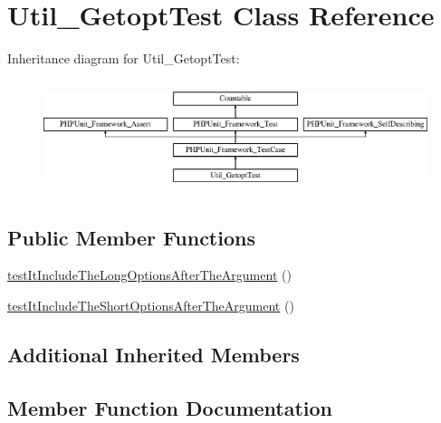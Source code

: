\hypertarget{class_util___getopt_test}{}\section{Util\+\_\+\+Getopt\+Test Class Reference}
\label{class_util___getopt_test}
Inheritance diagram for Util\+\_\+\+Getopt\+Test\+:\begin{figure}[H]
\begin{center}
\leavevmode
\includegraphics[height=3.303835cm]{class_util___getopt_test}
\end{center}
\end{figure}
\subsection*{Public Member Functions}
\begin{DoxyCompactItemize}
\item 
\mbox{\hyperlink{class_util___getopt_test_a905735c5b750529866bba801e8125eee}{test\+It\+Include\+The\+Long\+Options\+After\+The\+Argument}} ()
\item 
\mbox{\hyperlink{class_util___getopt_test_a4a9b5c6ef079722a8d6e6d9f22719749}{test\+It\+Include\+The\+Short\+Options\+After\+The\+Argument}} ()
\end{DoxyCompactItemize}
\subsection*{Additional Inherited Members}


\subsection{Member Function Documentation}
\mbox{\label{class_util___getopt_test_a905735c5b750529866bba801e8125eee}} 
